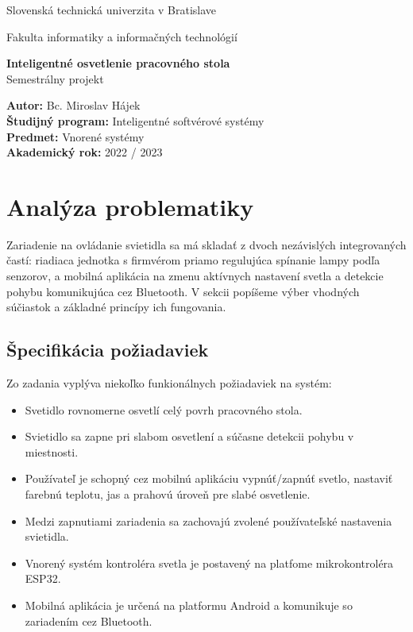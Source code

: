 \documentclass[12pt, a4paper]{article}
\begin{document}
\begin{titlepage}
{\centering
    {\Large Slovenská technická univerzita v Bratislave}\par
    {\Large Fakulta informatiky a informačných technológií}\par
    \vspace{\medskipamount}
    \vfill
    \LARGE \textbf{Inteligentné osvetlenie pracovného stola} \\
    \vspace{0.7\bigskipamount}
    {\Large Semestrálny projekt}\par
    \vfill
}
\normalsize    
\begin{flushleft}
\textbf{Autor:} Bc. Miroslav Hájek \\
\textbf{Študijný program:} Inteligentné softvérové systémy \\
\textbf{Predmet:} Vnorené systémy \\
\textbf{Akademický rok:} 2022 / 2023 \\
\end{flushleft}
\end{titlepage}

\thispagestyle{empty}


\tableofcontents
\newpage

\setcounter{page}{1}

\section{Analýza problematiky}
Zariadenie na ovládanie svietidla sa má skladať z dvoch nezávislých integrovaných častí: riadiaca jednotka s firmvérom priamo regulujúca spínanie lampy podľa senzorov, a mobilná aplikácia na zmenu aktívnych nastavení svetla a detekcie pohybu komunikujúca cez Bluetooth. V sekcii popíšeme výber vhodných súčiastok a základné princípy ich fungovania.

\subsection{Špecifikácia požiadaviek}
Zo zadania vyplýva niekoľko funkionálnych požiadaviek na systém:
\begin{itemize}
\itemsep0pt
\item Svetidlo rovnomerne osvetlí celý povrh pracovného stola.
\item Svietidlo sa zapne pri slabom osvetlení a súčasne detekcii pohybu v miestnosti.
\item Používateľ je schopný cez mobilnú aplikáciu vypnúť/zapnúť svetlo, nastaviť farebnú teplotu, jas a prahovú úroveň pre slabé osvetlenie.
\item Medzi zapnutiami zariadenia sa zachovajú zvolené používateľské nastavenia svietidla. 
\item Vnorený systém kontroléra svetla je postavený na platfome mikrokontroléra ESP32.
\item Mobilná aplikácia je určená na platformu Android a komunikuje so zariadením cez Bluetooth.
\end{itemize}
\end{document}
